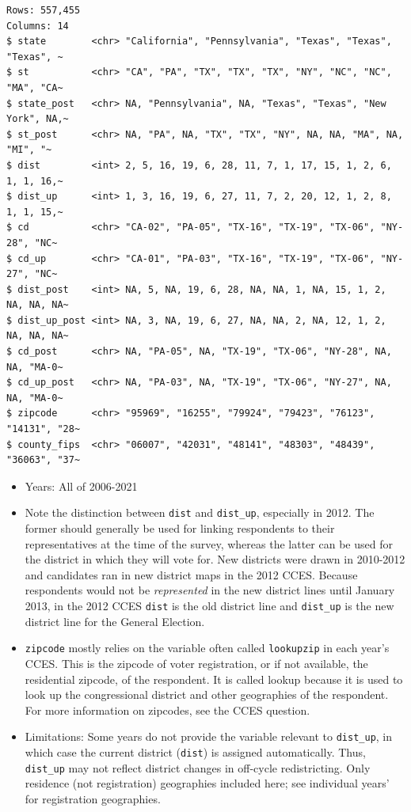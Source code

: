 \documentclass[10pt,article,oneside]{memoir}
\theoremstyle{definition}
\begin{document}
\begin{verbatim}
Rows: 557,455
Columns: 14
$ state        <chr> "California", "Pennsylvania", "Texas", "Texas", "Texas", ~
$ st           <chr> "CA", "PA", "TX", "TX", "TX", "NY", "NC", "NC", "MA", "CA~
$ state_post   <chr> NA, "Pennsylvania", NA, "Texas", "Texas", "New York", NA,~
$ st_post      <chr> NA, "PA", NA, "TX", "TX", "NY", NA, NA, "MA", NA, "MI", "~
$ dist         <int> 2, 5, 16, 19, 6, 28, 11, 7, 1, 17, 15, 1, 2, 6, 1, 1, 16,~
$ dist_up      <int> 1, 3, 16, 19, 6, 27, 11, 7, 2, 20, 12, 1, 2, 8, 1, 1, 15,~
$ cd           <chr> "CA-02", "PA-05", "TX-16", "TX-19", "TX-06", "NY-28", "NC~
$ cd_up        <chr> "CA-01", "PA-03", "TX-16", "TX-19", "TX-06", "NY-27", "NC~
$ dist_post    <int> NA, 5, NA, 19, 6, 28, NA, NA, 1, NA, 15, 1, 2, NA, NA, NA~
$ dist_up_post <int> NA, 3, NA, 19, 6, 27, NA, NA, 2, NA, 12, 1, 2, NA, NA, NA~
$ cd_post      <chr> NA, "PA-05", NA, "TX-19", "TX-06", "NY-28", NA, NA, "MA-0~
$ cd_up_post   <chr> NA, "PA-03", NA, "TX-19", "TX-06", "NY-27", NA, NA, "MA-0~
$ zipcode      <chr> "95969", "16255", "79924", "79423", "76123", "14131", "28~
$ county_fips  <chr> "06007", "42031", "48141", "48303", "48439", "36063", "37~
\end{verbatim}

\begin{itemize}
\tightlist
\item
  Years: All of 2006-2021
\item
  Note the distinction between \texttt{dist} and \texttt{dist\_up},
  especially in 2012. The former should generally be used for linking
  respondents to their representatives at the time of the survey,
  whereas the latter can be used for the district in which they will
  vote for. New districts were drawn in 2010-2012 and candidates ran in
  new district maps in the 2012 CCES. Because respondents would not be
  \emph{represented} in the new district lines until January 2013, in
  the 2012 CCES \texttt{dist} is the old district line and
  \texttt{dist\_up} is the new district line for the General Election.
\item
  \texttt{zipcode} mostly relies on the variable often called
  \texttt{lookupzip} in each year's CCES. This is the zipcode of voter
  registration, or if not available, the residential zipcode, of the
  respondent. It is called lookup because it is used to look up the
  congressional district and other geographies of the respondent. For
  more information on zipcodes, see the CCES question.
\item
  Limitations: Some years do not provide the variable relevant to
  \texttt{dist\_up}, in which case the current district (\texttt{dist})
  is assigned automatically. Thus, \texttt{dist\_up} may not reflect
  district changes in off-cycle redistricting. Only residence (not
  registration) geographies included here; see individual years' for
  registration geographies.
\end{itemize}
\end{document}
